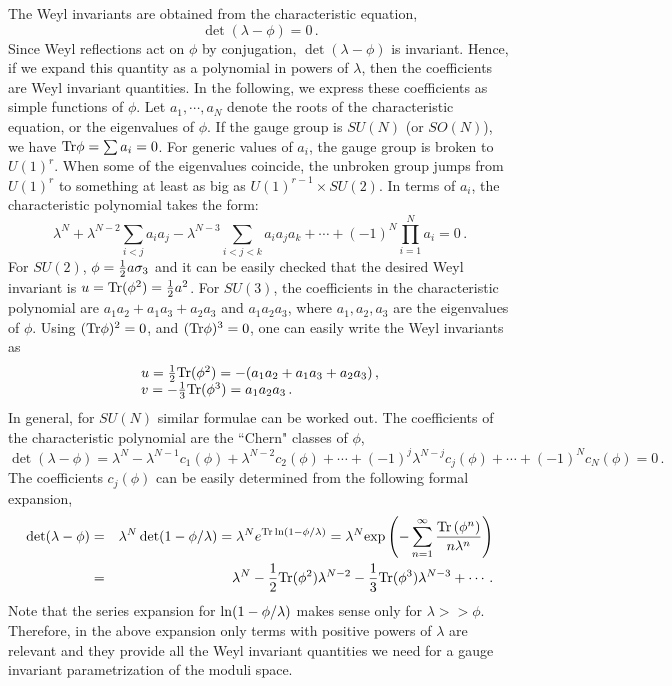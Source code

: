 The Weyl invariants are obtained from the characteristic equation, 
$$
\det (\lambda - \phi ) = 0\,.
$$
Since Weyl reflections act on $\phi$ by conjugation, $\det (\lambda
-\phi)$ is invariant. Hence, if we expand this quantity as a
polynomial in powers of $\lambda$, then the coefficients are Weyl
invariant quantities. In the following, we express these coefficients
as simple functions of $\phi$. Let $a_1,\cdots , a_N$ denote the roots
of the characteristic equation, or the eigenvalues of $\phi$. If the
gauge group is $SU(N)$ (or $SO(N)$), we have ${\rm Tr}\phi=\sum
a_i=0$. For generic values of $a_i$, the gauge group is broken to
$U(1)^r$. When some of the eigenvalues coincide, the unbroken group
jumps from $U(1)^r$ to something at least as big as $U(1)^{r-1}\times
SU(2)$. In terms of $a_i$, the characteristic polynomial takes the
form: 
$$
\lambda^N + \lambda^{N-2} \sum_{i<j} a_ia_j - \lambda^{N-3}
\sum_{i<j<k} a_ia_ja_k + \cdots + (-1)^N \prod_{i=1}^N a_i = 0\,.
$$
For $SU(2)$, $\phi={1\over 2}a\sigma_3$ and it can be easily checked
that the desired Weyl invariant is $u={\rm Tr}(\phi^2)={1\over2}
a^2$. For $SU(3)$, the coefficients in the characteristic polynomial
are  $a_1a_2+a_1a_3+a_2a_3$ and $a_1 a_2 a_3$, where $a_1, a_2, a_3$
are the eigenvalues of $\phi$. Using $({\rm Tr}\phi)^2=0$, and $({\rm 
Tr}\phi)^3=0$, one can easily write the Weyl invariants as    
$$
\begin{array}{ll}
u=\frac{1}{2}{\rm Tr}(\phi^2)=-(a_1a_2+a_1a_3+a_2a_3)\,,  \\
v=-\frac{1}{3}{\rm Tr}(\phi^3)=a_1 a_2 a_3\,.
\end{array}
$$
In general, for $SU(N)$ similar formulae can be worked out.  The
coefficients of the characteristic polynomial are the ``Chern" classes
of $\phi$, 
$$
\det(\lambda-\phi)=\lambda^N -\lambda^{N-1} c_{1}(\phi)+
\lambda^{N-2}c_{2}(\phi)+\cdots +(-1)^{j} \lambda^{N-j} c_{j} (\phi )+
\cdots + (-1)^N c_N(\phi)= 0\,.
$$
The coefficients $c_j(\phi)$ can be easily determined from the following
formal expansion,
\begin{eqnarray}
\det(\lambda -\phi) &=& \lambda^N \det (1-\phi/\lambda) =
\lambda^N e^{{\rm Tr\,ln}(1-\phi/\lambda)} 
=\lambda^N {\rm exp}\left(-\sum_{n=1}^\infty \frac{{\rm Tr}\,(\phi^n)}
{n\lambda^n}\right) \nonumber \\
&=& \lambda^N - \frac{1}{2}{\rm Tr}(\phi^2)\lambda^{N-2} -\frac{1}{3}
{\rm Tr}(\phi^3) \lambda^{N-3}+\cdots\,. \nonumber
\end{eqnarray} 
Note that the series expansion for ${\rm ln} (1-\phi/\lambda)$ makes
sense only for $\lambda >> \phi$. Therefore, in the above expansion
only terms with positive powers of $\lambda$ are relevant and they
provide all the Weyl invariant quantities we need for a gauge
invariant parametrization of the moduli space.

